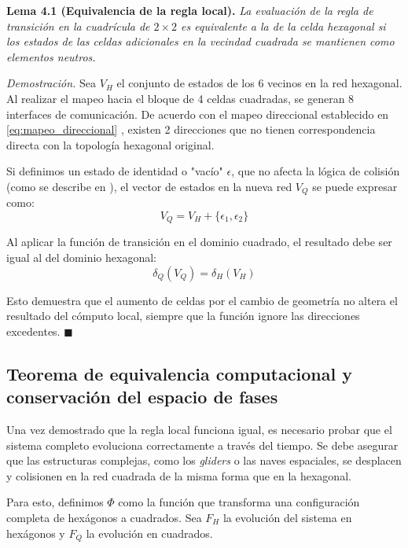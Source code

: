 \textbf{Lema 4.1 (Equivalencia de la regla local).} \textit{La evaluación de la regla de transición en la cuadrícula de $2 \times 2$ es equivalente a la de la celda hexagonal si los estados de las celdas adicionales en la vecindad cuadrada se mantienen como elementos neutros.}

\textit{Demostración.} Sea $V_H$ el conjunto de estados de los 6 vecinos en la red hexagonal. Al realizar el mapeo hacia el bloque de 4 celdas cuadradas, se generan 8 interfaces de comunicación. De acuerdo con el mapeo direccional establecido en \eqref{eq:mapeo_direccional} %
, existen 2 direcciones que no tienen correspondencia directa con la topología hexagonal original.

Si definimos un estado de identidad o "vacío" $\epsilon$, que no afecta la lógica de colisión (como se describe en \cite{Basurto2009}), el vector de estados en la nueva red $V_Q$ se puede expresar como:
\begin{equation}
V_Q = V_H + \{ \epsilon_1, \epsilon_2 \}
\label{eq:vector_extendido}
\end{equation}

Al aplicar la función de transición en el dominio cuadrado, el resultado debe ser igual al del dominio hexagonal:
\begin{equation}
\delta_Q(V_Q) = \delta_H(V_H)
\label{eq:igualdad_delta}
\end{equation}

Esto demuestra que el aumento de celdas por el cambio de geometría no altera el resultado del cómputo local, siempre que la función ignore las direcciones excedentes. $\blacksquare$

\subsection{Teorema de equivalencia computacional y conservación del espacio de fases}
\label{subsec:teorema_equivalencia_computacional}

Una vez demostrado que la regla local funciona igual, es necesario probar que el sistema completo evoluciona correctamente a través del tiempo. Se debe asegurar que las estructuras complejas, como los \textit{gliders} o las naves espaciales, se desplacen y colisionen en la red cuadrada de la misma forma que en la hexagonal.

Para esto, definimos $\Phi$ como la función que transforma una configuración completa de hexágonos a cuadrados. Sea $F_H$ la evolución del sistema en hexágonos y $F_Q$ la evolución en cuadrados.

